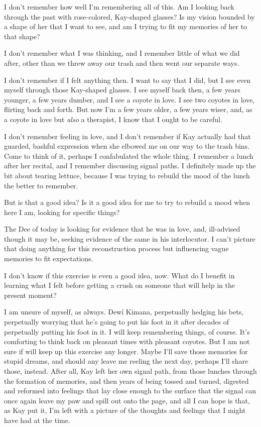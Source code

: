 I don't remember how well I'm remembering all of this. Am I looking back through the past with rose-colored, Kay-shaped glasses? Is my vision bounded by a shape of her that I want to see, and am I trying to fit my memories of her to that shape?

I don't remember what I was thinking, and I remember little of what we did after, other than we threw away our trash and then went our separate ways.

I don't remember if I felt anything then. I want to say that I did, but I see even myself through those Kay-shaped glasses. I see myself back then, a few years younger, a few years dumber, and I see a coyote in love. I see two coyotes in love, flirting back and forth. But now I'm a few years older, a few years wiser, and, as a coyote in love but \emph{also} a therapist, I know that I ought to be careful.

I don't remember feeling in love, and I don't remember if Kay actually had that guarded, bashful expression when she elbowed me on our way to the trash bins. Come to think of it, perhaps I confabulated the whole thing. I remember a lunch after her recital, and I remember discussing signal paths. I definitely made up the bit about tearing lettuce, because I was trying to rebuild the mood of the lunch the better to remember.

But is that a good idea? Is it a good idea for me to try to rebuild a mood when here I am, looking for specific things?

The Dee of today is looking for evidence that he was in love, and, ill-advised though it may be, seeking evidence of the same in his interlocutor. I can't picture that doing anything for this reconstruction process but influencing vague memories to fit expectations.

I don't know if this exercise is even a good idea, now. What do I benefit in learning what I felt before getting a crush on someone that will help in the present moment?

I am unsure of myself, as always. Dewí Kimana, perpetually hedging his bets, perpetually worrying that he's going to put his foot in it after decades of perpetually putting his foot in it. I will keep remembering things, of course. It's comforting to think back on pleasant times with pleasant coyotes. But I am not sure if will keep up this exercise any longer. Maybe I'll save those memories for stupid dreams, and should any leave me reeling the next day, perhaps I'll share those, instead. After all, Kay left her own signal path, from those lunches through the formation of memories, and then years of being tossed and turned, digested and reformed into feelings that lay close enough to the surface that the signal can once again leave my paw and spill out onto the page, and all I can hope is that, as Kay put it, I'm left with a picture of the thoughts and feelings that I might have had at the time.

